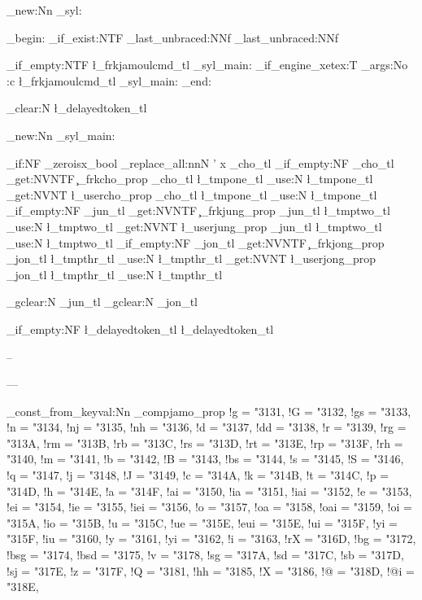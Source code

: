 \cs_new:Nn \build_syl:
{
  \group_begin:
    \cs_if_exist:NTF \hangulfontspec
  	{
  		\exp_last_unbraced:NNf \hangulfontspec [ \frkhangulfontfeature ] { \frkhangulfont }
  	}
  	{
  		\exp_last_unbraced:NNf \fontspec [ \frkhangulfontfeature ] { \frkhangulfont }
  	}

  	\tl_if_empty:NTF \l_frkjamoulcmd_tl
  	{
  		\build_syl_main:
  	}
  	{
  	  \sys_if_engine_xetex:T { \allowbreak }
  	  \exp_args:No \use:c { \l_frkjamoulcmd_tl } {
  	  	\build_syl_main:
  	  }
  	}
	\group_end:

	\tl_clear:N \l_delayedtoken_tl
}

\cs_new:Nn \build_syl_main:
{
	\bool_if:NF \opt_zeroisx_bool
	{
		\regex_replace_all:nnN { ' } { x } \g_cho_tl
	}
	\tl_if_empty:NF \g_cho_tl
	{
		\prop_get:NVNTF \c_frkcho_prop \g_cho_tl \l_tmpone_tl 
			{ \tl_use:N \l_tmpone_tl }
			{
				\prop_get:NVNT \l_usercho_prop \g_cho_tl \l_tmpone_tl
				{ \tl_use:N \l_tmpone_tl }
			}
	}
	\tl_if_empty:NF \g_jun_tl
	{
		\prop_get:NVNTF \c_frkjung_prop \g_jun_tl \l_tmptwo_tl 
			{ \tl_use:N \l_tmptwo_tl }
			{
				\prop_get:NVNT \l_userjung_prop \g_jun_tl \l_tmptwo_tl
				{ \tl_use:N \l_tmptwo_tl }
			}
	}
	\tl_if_empty:NF \g_jon_tl 
	{
		\prop_get:NVNTF \c_frkjong_prop \g_jon_tl \l_tmpthr_tl 
			{ \tl_use:N \l_tmpthr_tl }
			{
				\prop_get:NVNT \l_userjong_prop \g_jon_tl \l_tmpthr_tl
				{ \tl_use:N \l_tmpthr_tl }
			}
	}

	\tl_gclear:N \g_jun_tl
	\tl_gclear:N \g_jon_tl

	\tl_if_empty:NF \l_delayedtoken_tl
	{
		\l_delayedtoken_tl
	}
}

\NewDocumentCommand \frdash { }
{
}

\NewDocumentCommand \frendash {}
{
	--
}

\NewDocumentCommand \fremdash {}
{
	---
}

\prop_const_from_keyval:Nn \my_compjamo_prop
{
	!g	= \char"3131,
	!G	= \char"3132,
	!gs	= \char"3133,
	!n	= \char"3134,
	!nj	= \char"3135,
	!nh	= \char"3136,
	!d	= \char"3137,
	!dd	= \char"3138,
	!r	= \char"3139,
	!rg	= \char"313A,
	!rm	= \char"313B,
	!rb	= \char"313C,
	!rs	= \char"313D,
	!rt	= \char"313E,
	!rp	= \char"313F,
	!rh	= \char"3140,
	!m	= \char"3141,
	!b	= \char"3142,
	!B	= \char"3143,
	!bs	= \char"3144,
	!s	= \char"3145,
	!S	= \char"3146,
	!q	= \char"3147,
	!j	= \char"3148,
	!J	= \char"3149,
	!c	= \char"314A,
	!k	= \char"314B,
	!t	= \char"314C,
	!p	= \char"314D,
	!h	= \char"314E,
	!a	= \char"314F,
	!ai	= \char"3150,
	!ia	= \char"3151,
	!iai	= \char"3152,
	!e	= \char"3153,
	!ei	= \char"3154,
	!ie	= \char"3155,
	!iei	= \char"3156,
	!o	= \char"3157,
	!oa	= \char"3158,
	!oai	= \char"3159,
	!oi	= \char"315A,
	!io	= \char"315B,
	!u	= \char"315C,
	!ue	= \char"315E,
	!eui	= \char"315E,
	!ui	= \char"315F,
	!yi	= \char"315F,
	!iu	= \char"3160,
	!y	= \char"3161,
	!yi	= \char"3162,
	!i	= \char"3163,
	!rX	= \char"316D,
	!bg	= \char"3172,
	!bsg	= \char"3174,
	!bsd	= \char"3175,
	!v	= \char"3178,
	!sg	= \char"317A,
	!sd	= \char"317C,
	!sb	= \char"317D,
	!sj	= \char"317E,
	!z	= \char"317F,
	!Q	= \char"3181,
	!hh	= \char"3185,
	!X	= \char"3186,
	!@ 	= \char"318D,
	!@i	= \char"318E,
}

